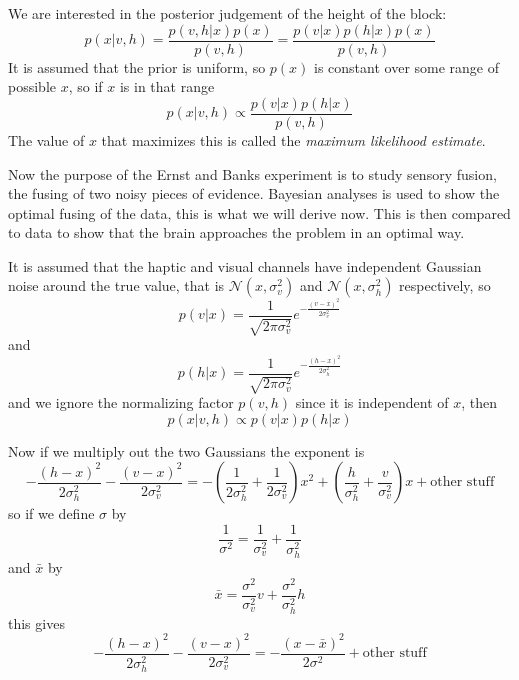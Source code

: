 \documentclass[12pt]{article}
\begin{document}
We are interested in the posterior judgement of the height of the block:
\begin{equation}
p(x|v,h)=\frac{p(v,h|x)p(x)}{p(v,h)}=\frac{p(v|x)p(h|x)p(x)}{p(v,h)}
\end{equation}
It is assumed that the prior is uniform, so $p(x)$ is constant over some range of possible $x$, so if $x$ is in that range
\begin{equation}
p(x|v,h)\propto \frac{p(v|x)p(h|x)}{p(v,h)}
\end{equation}
The value of $x$ that maximizes this is called the \textsl{maximum likelihood estimate}.

Now the purpose of the Ernst and Banks experiment is to study sensory
fusion, the fusing of two noisy pieces of evidence. Bayesian analyses
is used to show the optimal fusing of the data, this is what we will
derive now. This is then compared to data to show that the brain
approaches the problem in an optimal way. 

It is assumed that the haptic and visual channels have independent
Gaussian noise around the true value, that is
$\mathcal{N}(x,\sigma_v^2)$ and $\mathcal{N}(x,\sigma_h^2)$
respectively, so
\begin{equation}
p(v|x)=\frac{1}{\sqrt{2\pi\sigma_v^2}}e^{-\frac{(v-x)^2}{2\sigma_v^2}}
\end{equation}
and 
\begin{equation}
p(h|x)=\frac{1}{\sqrt{2\pi\sigma_v^2}}e^{-\frac{(h-x)^2}{2\sigma_h^2}}
\end{equation}
and we ignore the normalizing factor $p(v,h)$ since it is independent of $x$, then
\begin{equation}
p(x|v,h)\propto p(v|x)p(h|x)
\end{equation}

Now if we multiply out the two Gaussians the exponent is
\begin{equation}
-\frac{(h-x)^2}{2\sigma_h^2}-\frac{(v-x)^2}{2\sigma_v^2}=-\left(\frac{1}{2\sigma_h^2}+\frac{1}{2\sigma_v^2}\right)x^2+\left(\frac{h}{\sigma_h^2}+\frac{v}{\sigma_v^2}\right)x+\mbox{other stuff}
\end{equation}
so if we define $\sigma$ by
\begin{equation}
\frac{1}{\sigma^2}=\frac{1}{\sigma_v^2}+\frac{1}{\sigma_h^2}
\end{equation}
and $\bar{x}$ by
\begin{equation}
\bar{x}=\frac{\sigma^2}{\sigma_v^2}v+\frac{\sigma^2}{\sigma_h^2}h
\end{equation}
this gives
\begin{equation}
-\frac{(h-x)^2}{2\sigma_h^2}-\frac{(v-x)^2}{2\sigma_v^2}=-\frac{(x-\bar{x})^2}{2\sigma^2}+\mbox{other stuff}
\end{equation}
\end{document}
